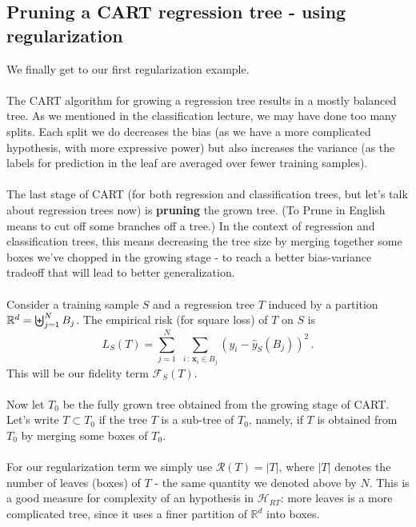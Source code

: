 \documentclass[11pt]{article}
\newcommand{\R}{\ensuremath{\mathbb{R}}}
\newcommand{\Rc}{\mathcal{R}}
\newcommand{\Fc}{\mathcal{F}}
\newcommand{\Hc}{\mathcal{H}}
\newcommand{\V}[1]{\mathbf{#1}}
\begin{document}
    \subsection{Pruning a CART regression tree - using regularization}

    We finally get to our first regularization example. 
\\~\\
    The CART algorithm for growing a regression tree results in a mostly balanced
    tree. As we mentioned in the classification lecture, we may have done too
    many splits. Each split we do decreases the bias (as we have a more
    complicated hypothesis, with more expressive power) but also increases the
    variance (as the labels for prediction in the leaf are averaged over fewer
    training samples).
\\~\\
    The last stage of CART (for both regression and classification trees, but
    let's talk about regression trees now) is  {\bf pruning} the grown tree.
    (To Prune in English means to cut off some branches off a tree.)
    In the context of regression and classification trees, this
    means decreasing the tree size by merging together some boxes
    we've chopped in the growing stage - to reach a better bias-variance
    tradeoff that will lead to better generalization. 
    \\~\\
    Consider a training
    sample $S$ and a  regression tree
    $T$ induced by a
    partition $\mathbb{R}^d=\biguplus_{j=1}^N B_j$. 
%
The empirical risk (for
    square loss) of $T$ on $S$ is 
    \[
      L_S(T) = \sum_{j=1}^N \,\,\sum_{i\,:\, \V{x}_i\in B_j}
      (y_i-\hat{y}_S(B_j))^2\,.
    \]
    This will be our fidelity term $\Fc_S(T)$.
    \\~\\
    Now let $T_0$ be the fully grown tree obtained from the growing stage of
    CART. 
    Let's write $T\subset T_0$ if the tree $T$ is a sub-tree of $T_0$, namely,
    if $T$ is obtained from $T_0$ by merging some boxes of $T_0$.
\\~\\
For our regularization term we simply use $\Rc(T)=|T|$, where $|T|$ denotes the
number of leaves (boxes) of $T$ - the same quantity we denoted above by $N$.
This is a good
    measure for complexity of an hypothesis in $\Hc_{RT}$: more leaves is 
    a more complicated tree, since it uses
    a finer partition of $\R^d$ into boxes.
\\~\\
\end{document}
